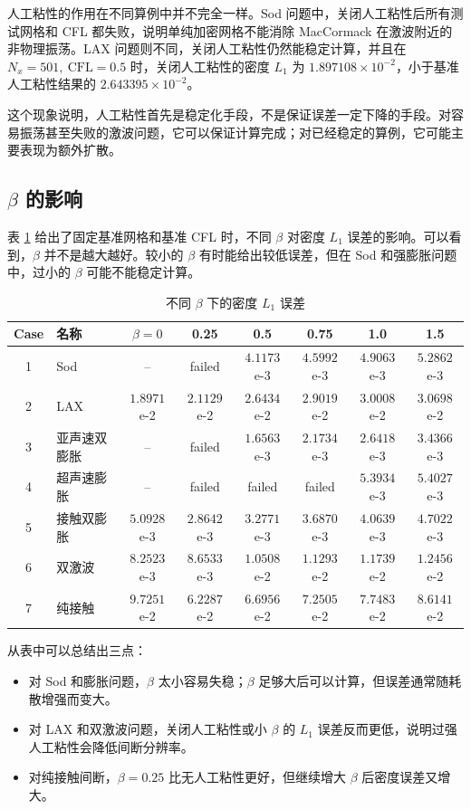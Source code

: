 \documentclass[UTF8,12pt,a4paper]{ctexart}
\begin{document}
人工粘性的作用在不同算例中并不完全一样。Sod 问题中，关闭人工粘性后所有测试网格和 CFL 都失败，说明单纯加密网格不能消除 MacCormack 在激波附近的非物理振荡。LAX 问题则不同，关闭人工粘性仍然能稳定计算，并且在 $N_x=501,\ \mathrm{CFL}=0.5$ 时，关闭人工粘性的密度 $L_1$ 为 $1.897108\times10^{-2}$，小于基准人工粘性结果的 $2.643395\times10^{-2}$。

这个现象说明，人工粘性首先是稳定化手段，不是保证误差一定下降的手段。对容易振荡甚至失败的激波问题，它可以保证计算完成；对已经稳定的算例，它可能主要表现为额外扩散。

\subsection{$\beta$ 的影响}

表 \ref{tab:beta} 给出了固定基准网格和基准 CFL 时，不同 $\beta$ 对密度 $L_1$ 误差的影响。可以看到，$\beta$ 并不是越大越好。较小的 $\beta$ 有时能给出较低误差，但在 Sod 和强膨胀问题中，过小的 $\beta$ 可能不能稳定计算。

\begin{table}[H]
    \centering
    \caption{不同 $\beta$ 下的密度 $L_1$ 误差}
    \label{tab:beta}
    \begin{tabular}{clcccccc}
        \toprule
        Case & 名称 & $\beta=0$ & 0.25 & 0.5 & 0.75 & 1.0 & 1.5 \\
        \midrule
        1 & Sod & -- & failed & $4.1173$e-3 & $4.5992$e-3 & $4.9063$e-3 & $5.2862$e-3 \\
        2 & LAX & $1.8971$e-2 & $2.1129$e-2 & $2.6434$e-2 & $2.9019$e-2 & $3.0008$e-2 & $3.0698$e-2 \\
        3 & 亚声速双膨胀 & -- & failed & $1.6563$e-3 & $2.1734$e-3 & $2.6418$e-3 & $3.4366$e-3 \\
        4 & 超声速膨胀 & -- & failed & failed & failed & $5.3934$e-3 & $5.4027$e-3 \\
        5 & 接触双膨胀 & $5.0928$e-3 & $2.8642$e-3 & $3.2771$e-3 & $3.6870$e-3 & $4.0639$e-3 & $4.7022$e-3 \\
        6 & 双激波 & $8.2523$e-3 & $8.6533$e-3 & $1.0508$e-2 & $1.1293$e-2 & $1.1739$e-2 & $1.2456$e-2 \\
        7 & 纯接触 & $9.7251$e-2 & $6.2287$e-2 & $6.6956$e-2 & $7.2505$e-2 & $7.7483$e-2 & $8.6141$e-2 \\
        \bottomrule
    \end{tabular}
\end{table}

从表中可以总结出三点：
\begin{itemize}
    \item 对 Sod 和膨胀问题，$\beta$ 太小容易失稳；$\beta$ 足够大后可以计算，但误差通常随耗散增强而变大。
    \item 对 LAX 和双激波问题，关闭人工粘性或小 $\beta$ 的 $L_1$ 误差反而更低，说明过强人工粘性会降低间断分辨率。
    \item 对纯接触间断，$\beta=0.25$ 比无人工粘性更好，但继续增大 $\beta$ 后密度误差又增大。
\end{itemize}
\end{document}
